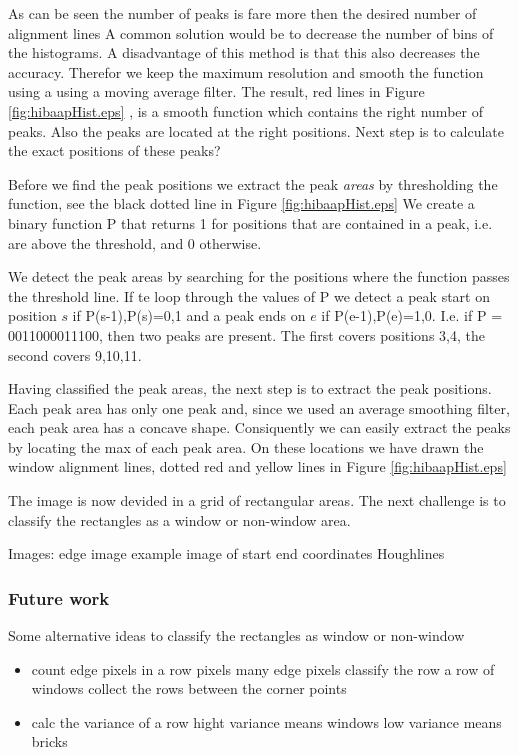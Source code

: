 As can be seen the number of peaks is fare more then the desired number of alignment lines 
A common solution would be to decrease the number of bins of the histograms. A
disadvantage of this method is that this also decreases the accuracy. Therefor
we keep the maximum resolution and smooth the function using a using a moving
average filter.
The result, red lines in Figure \ref{fig:hibaapHist.eps}
, is a smooth function which contains the right number of peaks. Also the peaks
are located at the right positions. Next step is to calculate the exact positions of these
peaks?

Before we find the peak positions we extract the peak \emph{areas} by thresholding the
function, see the black dotted line in Figure \ref{fig:hibaapHist.eps}
We create a binary function P that returns 1 for positions that are contained in
a peak, i.e. are above the threshold, and 0 otherwise.

We detect the peak areas by searching for the positions where the function
passes the threshold line. 
If te loop through the values of P we detect a peak start on position $s$ if {P(s-1),P(s)}={0,1}
and a peak ends on $e$ if {P(e-1),P(e)}={1,0}. 
I.e. if P = 0011000011100, then two peaks are present. The first covers positions {3,4}, 
the second covers {9,10,11}. 

Having classified the peak areas, the next step is to extract the peak positions. 
Each peak area has only one peak and, since we used an average smoothing filter, each
peak area has a concave shape. Consiquently we can easily extract the peaks
by locating the max of each peak area. 
On these locations we have drawn the window alignment lines, dotted red and yellow lines
in Figure \ref{fig:hibaapHist.eps}

The image is now devided in a grid of rectangular areas. The next challenge is to 
classify the rectangles as a window or non-window area.


Images:
edge image
example image of start end coordinates Houghlines


\subsubsection{Future work}
Some alternative ideas to classify the rectangles as window or non-window
\begin{itemize}
	\item count edge pixels in a row pixels
		many edge pixels classify the row a row of windows
		collect the rows between the corner points
	\item calc the variance of a row
		hight variance means windows
		low variance means bricks
\end{itemize}


